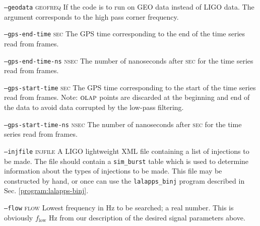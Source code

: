 \begin{entry}
\begin{entry}
\item[\option{--frame-dir} \parm{directory}]

\item[\option{--frame-sample-rate} \parm{Hz}]

\item[\option{--geodata} \parm{high pass corner frequency}]
\item[\texttt{--geodata} \textsc{geofreq}] If the code is to run on GEO
data instead of LIGO data. The argument corresponds to the high pass corner
frequency. 

\item[\option{--gps-end-time} \parm{seconds}]
\item[\texttt{--gps-end-time} \textsc{sec}] The GPS time
corresponding to the end of the time series read from frames.  

\item[\option{--gps-end-time-ns} \parm{nanoseconds}]
\item[\texttt{--gps-end-time-ns} \textsc{nsec}] The number of
nanoseconds after \textsc{sec} for the time series read from frames.

\item[\option{--gps-start-time} \parm{seconds}]
\item[\texttt{--gps-start-time} \textsc{sec}] The GPS time
corresponding to the start of the time series read from frames.  Note:  
$\textsc{olap}$ points are discarded at the beginning and end of the
data to avoid data corrupted by the low-pass filtering.

\item[\option{--gps-start-time-ns} \parm{nanoseconds}]
\item[\texttt{--gps-start-time-ns} \textsc{nsec}] The number of
nanoseconds after \textsc{sec} for the time series read from frames. 

\item[\option{--help}]

\item[\option{--injection-file} \parm{file name}]
\item[\texttt{--injfile} \textsc{injfile}]  A LIGO lightweight XML
file containing a list of injections to be made.   The file should
contain a \verb+sim_burst+ table which is used to determine
information about the types of injections to be made.    This file may
be constructed by hand,  or once can use the \verb+lalapps_binj+
program described in Sec. \ref{program:lalapps-binj}.   

\item[\option{--low-freq-cutoff} \parm{flow}]
\item[\texttt{--flow} \textsc{flow}] Lowest frequency in Hz to be searched;
a real number.  This is obviously $f_{\mathrm{low}}$ Hz from our
description of the desired signal parameters above.


\end{entry}
\end{entry}
